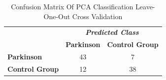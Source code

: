 \documentclass[10pt, conference, compsocconf]{IEEEtran}
\begin{document}
\begin{table}[!htbp]
\caption{Confusion Matrix Of PCA Classification Leave-One-Out Cross Validation}
\label{table:resultadomatrizconfusaosvm}
\centering
\begin{tabular}{l|c|c|}
\cline{2-3}
\multicolumn{1}{c}{}                         & \multicolumn{2}{|c|}{\textit{\textbf{Predicted Class}}} \\ \cline{2-3} 
                                             & \textbf{Parkinson}      & \textbf{Control Group}         \\ \hline
\multicolumn{1}{|l|}{\textbf{Parkinson}} & 43       & 7          \\ \hline
\multicolumn{1}{|l|}{\textbf{Control Group}}     & 12           & 38     \\ \hline
\end{tabular}
\end{table}



\end{document}
